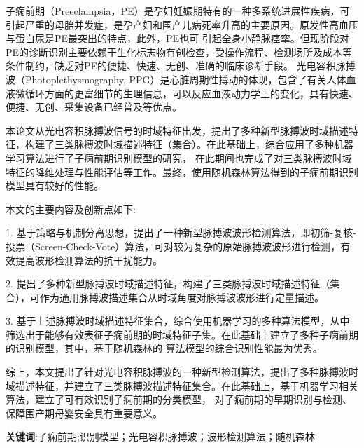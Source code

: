 \cleardoublepage
{}
子痫前期（Preeclampsia，PE）是孕妇妊娠期特有的一种多系统进展性疾病，可引起严重的母胎并发症，是孕产妇和围产儿病死率升高的主要原因。原发性高血压与蛋白尿是PE最突出的特点，此外，PE也可
引起全身小静脉痉挛。但现阶段对PE的诊断识别主要依赖于生化标志物有创检查，受操作流程、检测场所及成本等条件制约，缺乏对PE的便捷、快速、无创、准确的临床诊断手段。
光电容积脉搏波（Photoplethysmography, PPG）是心脏周期性搏动的体现，包含了有关人体血液微循环方面的更富细节的生理信息，可以反应血液动力学上的变化，具有快速、便捷、无创、采集设备已经普及等优点。

本论文从光电容积脉搏波信号的时域特征出发，提出了多种新型脉搏波时域描述特征，构建了三类脉搏波时域描述特征（集合）。在此基础上，综合应用了多种机器学习算法进行了子痫前期识别模型的研究，
在此期间也完成了对三类脉搏波时域特征的降维处理与性能评估等工作。最终，使用随机森林算法得到的子痫前期识别模型具有较好的性能。

本文的主要内容及创新点如下:

1. 基于策略与机制分离思想，提出了一种新型脉搏波波形检测算法，即初筛-复核-投票（Screen-Check-Vote）算法，可对较为复杂的原始脉搏波波形进行检测，有效提高波形检测算法的抗干扰能力。

2. 提出了多种新型脉搏波时域描述特征，构建了三类脉搏波时域描述特征（集合），可作为通用脉搏波描述集合从时域角度对脉搏波波形进行定量描述。

3. 基于上述脉搏波时域描述特征集合，综合使用机器学习的多种算法模型，从中筛选出于能够有效表征子痫前期的时域特征子集。在此基础上建立了多种子痫前期的识别模型，其中，基于随机森林的
算法模型的综合识别性能最为优秀。

综上，本文提出了针对光电容积脉搏波的一种新型检测算法，提出了多种脉搏波时域描述特征，并建立了三类脉搏波描述特征集合。在此基础上，基于机器学习相关算法，建立了可有效识别子痫前期的分类模型，
对子痫前期的早期识别与检测、保障围产期母婴安全具有重要意义。


\textbf{关键词}:子痫前期;识别模型；光电容积脉搏波；波形检测算法；随机森林



\cleardoublepage
{}